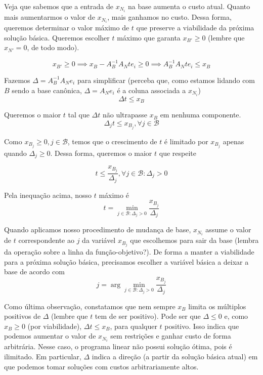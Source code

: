 \documentclass[]{article}
\numberwithin{equation}{section}
\begin{document}
Veja que sabemos que a entrada de $x_{N_i}$ na base aumenta o custo atual.
Quanto mais aumentarmos o valor de $x_{N_i}$, mais ganhamos no custo.
Dessa forma, queremos determinar o valor máximo de $t$ que preserve a viabilidade da próxima solução
básica.
Queremos escolher $t$ máximo que garanta $x_{B'} \geq 0$ (lembre que $x_{N'} = 0$, de todo modo).

$$
x_{B'} \geq 0 \implies x_B - A_B^{-1}A_Nte_i \geq 0 \implies A_B^{-1}A_Nte_i \leq x_B
$$

Fazemos $\Delta = A_B^{-1}A_Ne_i$ para simplificar (perceba que, como estamos lidando com $B$ sendo a
base canônica, $\Delta = A_Ne_i$ é a coluna associada a $x_{N_i}$)
$$
\Delta t \leq x_B
$$

Queremos o maior $t$ tal que $\Delta t$ não ultrapasse $x_B$ em nenhuma componente.
$$
\Delta_j t \leq x_{B_j}, \forall j \in \mathcal{B}
$$

Como $x_{B_j} \geq 0, j \in \mathcal{B}$, temos que o crescimento de $t$ é limitado por $x_{B_j}$
apenas quando $\Delta_j \geq 0$.
Dessa forma, queremos o maior $t$ que respeite

$$
t \leq \frac{x_{B_j}}{\Delta_j}, \forall j \in \mathcal{B} : \Delta_j > 0
$$

Pela inequação acima, nosso $t$ máximo é
$$
t = \min_{j \in \mathcal{B} : \Delta_j > 0} \frac{x_{B_j}}{\Delta_j}
$$

Quando aplicamos nosso procedimento de mudança de base, $x_{N_i}$ assume o valor de $t$ correspondente
ao $j$ da variável $x_{B_j}$ que escolhemos para sair da base (lembra da operação sobre a linha da
função-objetivo?).
De forma a manter a viabilidade para a próxima solução básica, precisamos escolher a variável básica a
deixar a base de acordo com
$$
j = \arg\min_{j \in \mathcal{B} : \Delta_j > 0} \frac{x_{B_j}}{\Delta_j}
$$

Como última observação, constatamos que nem sempre $x_B$ limita os múltiplos positivos de $\Delta$
(lembre que $t$ tem de ser positivo).
Pode ser que $\Delta \leq 0$ e, como $x_B \geq 0$ (por viabilidade), $\Delta t \leq x_B$, para qualquer
$t$ positivo.
Isso indica que podemos aumentar o valor de $x_{N_i}$ sem restrições e ganhar custo de forma arbitrária.
Nesse caso, o programa linear não possui solução ótima, pois é ilimitado.
Em particular, $\Delta$ indica a direção (a partir da solução básica atual) em que podemos tomar
soluções com custos arbitrariamente altos.
\end{document}
